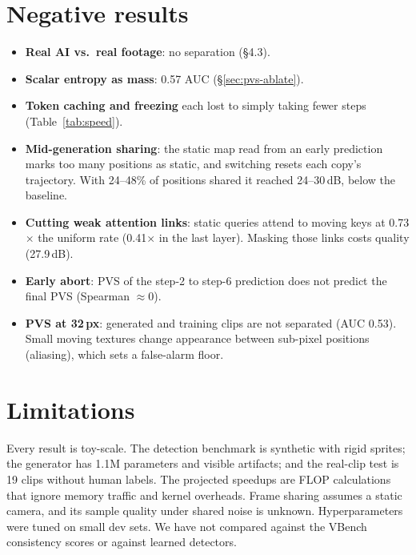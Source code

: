 \documentclass[10pt,twocolumn,letterpaper]{article}
\begin{document}
\section{Negative results}\label{sec:negative}
\begin{itemize}
\item \textbf{Real AI vs.\ real footage}: no separation (\S4.3).
\item \textbf{Scalar entropy as mass}: 0.57 AUC (\S\ref{sec:pvs-ablate}).
\item \textbf{Token caching and freezing} each lost to simply taking fewer steps (Table~\ref{tab:speed}).
\item \textbf{Mid-generation sharing}: the static map read from an early prediction marks too many positions as static, and switching resets each copy's trajectory. With 24--48\% of positions shared it reached 24--30\,dB, below the baseline.
\item \textbf{Cutting weak attention links}: static queries attend to moving keys at 0.73$\times$ the uniform rate (0.41$\times$ in the last layer). Masking those links costs quality (27.9\,dB).
\item \textbf{Early abort}: PVS of the step-2 to step-6 prediction does not predict the final PVS (Spearman $\approx$0).
\item \textbf{PVS at 32\,px}: generated and training clips are not separated (AUC 0.53). Small moving textures change appearance between sub-pixel positions (aliasing), which sets a false-alarm floor.
\end{itemize}

\section{Limitations}
Every result is toy-scale. The detection benchmark is synthetic with rigid sprites; the generator has 1.1M parameters and visible artifacts; and the real-clip test is 19 clips without human labels. The projected speedups are FLOP calculations that ignore memory traffic and kernel overheads. Frame sharing assumes a static camera, and its sample quality under shared noise is unknown. Hyperparameters were tuned on small dev sets. We have not compared against the VBench consistency scores or against learned detectors.
\end{document}
